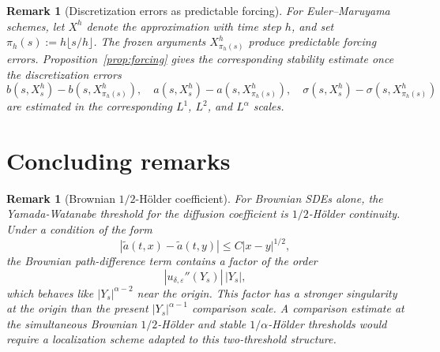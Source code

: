 \documentclass[10pt,a4paper]{amsart}
\newtheorem{remark}[theorem]{Remark}
\newcommand{\1}{\mathbf{1}}
\newcommand{\wt}{\tilde}
\newcommand{\eps}{\varepsilon}
\begin{document}
\begin{remark}[Discretization errors as predictable forcing]
For Euler--Maruyama schemes, let $X^h$ denote the approximation with time step $h$, and set $\pi_h(s):=h\lfloor s/h\rfloor$. The frozen arguments $X_{\pi_h(s)}^{h}$ produce predictable forcing errors. Proposition~\ref{prop:forcing} gives the corresponding stability estimate once the discretization errors
\[
  b(s,X_s^h)-b(s,X_{\pi_h(s)}^h),\quad
  a(s,X_s^h)-a(s,X_{\pi_h(s)}^h),\quad
  \sigma(s,X_s^h)-\sigma(s,X_{\pi_h(s)}^h)
\]
are estimated in the corresponding $L^1$, $L^2$, and $L^\alpha$ scales.
\end{remark}

\section{Concluding remarks}
\label{sec:concluding}

\begin{remark}[Brownian $1/2$-H\"older coefficient]
For Brownian SDEs alone, the Yamada-Watanabe threshold for the diffusion coefficient is $1/2$-H\"older continuity. Under a condition of the form
\[
  |\wt a(t,x)-\wt a(t,y)|\le C|x-y|^{1/2},
\]
the Brownian path-difference term contains a factor of the order
\[
  |u_{\delta,\eps}''(Y_s)|\,|Y_s|,
\]
which behaves like $|Y_s|^{\alpha-2}$ near the origin.
This factor has a stronger singularity at the origin than the present $|Y_s|^{\alpha-1}$ comparison scale. A comparison estimate at the simultaneous Brownian $1/2$-H\"older and stable $1/\alpha$-H\"older thresholds would require a localization scheme adapted to this two-threshold structure.
\end{remark}
\end{document}
